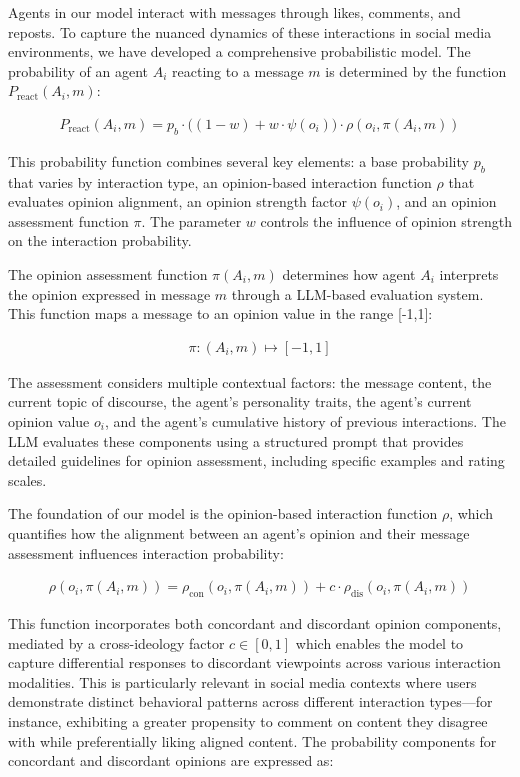 Agents in our model interact with messages through likes, comments, and reposts. To capture the nuanced dynamics of these interactions in social media environments, we have developed a comprehensive probabilistic model. The probability of an agent $A_i$ reacting to a message $m$ is determined by the function $P_{\text{react}}(A_i, m)$:

\begin{align}
P_{\text{react}}(A_i, m) = p_b \cdot \big((1-w) + w \cdot \psi(o_i)\big) \cdot \rho(o_i, \pi(A_i, m))
\end{align}



This probability function combines several key elements: a base probability $p_b$ that varies by interaction type, an opinion-based interaction function $\rho$ that evaluates opinion alignment, an opinion strength factor $\psi(o_i)$, and an opinion assessment function $\pi$. The parameter $w$ controls the influence of opinion strength on the interaction probability.

The opinion assessment function $\pi(A_i, m)$ determines how agent $A_i$ interprets the opinion expressed in message $m$ through a LLM-based evaluation system. This function maps a message to an opinion value in the range [-1,1]:

\begin{align}
\pi: (A_i, m) \mapsto [-1,1]
\end{align}

The assessment considers multiple contextual factors: the message content, the current topic of discourse, the agent's personality traits, the agent's current opinion value $o_i$, and the agent's cumulative history of previous interactions. The LLM evaluates these components using a structured prompt that provides detailed guidelines for opinion assessment, including specific examples and rating scales.

The foundation of our model is the opinion-based interaction function $\rho$, which quantifies how the alignment between an agent's opinion and their message assessment influences interaction probability:

\begin{align}
\rho(o_i, \pi(A_i, m)) = \rho_{\text{con}}(o_i, \pi(A_i, m)) + c \cdot \rho_{\text{dis}}(o_i, \pi(A_i, m))
\end{align}

This function incorporates both concordant and discordant opinion components, mediated by a cross-ideology factor $c \in [0,1]$ which enables the model to capture differential responses to discordant viewpoints across various interaction modalities. This is particularly relevant in social media contexts where users demonstrate distinct behavioral patterns across different interaction types---for instance, exhibiting a greater propensity to comment on content they disagree with while preferentially liking aligned content. The probability components for concordant and discordant opinions are expressed as:

